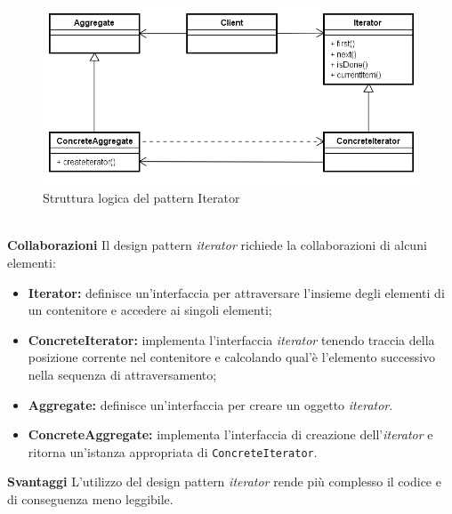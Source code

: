 \\
\label{Struttura logica del pattern Iterator}
\begin{figure}
	\centering
	\includegraphics[scale=0.45]{UML/Package/strutturaPattern/Iterator.png}
	\caption{Struttura logica del pattern Iterator}
\end{figure}
\\
\textbf{Collaborazioni}	Il design pattern \textit{iterator} richiede la collaborazioni di alcuni elementi:
	\begin{itemize}
		\item \textbf{Iterator:} definisce un'interfaccia per attraversare l'insieme degli elementi di un contenitore e accedere ai singoli elementi;
		\item \textbf{ConcreteIterator:} implementa l'interfaccia \textit{iterator} tenendo traccia della posizione corrente nel contenitore e calcolando qual'è l'elemento successivo nella sequenza di attraversamento;
		\item \textbf{Aggregate:} definisce un'interfaccia per creare un oggetto \textit{iterator}.
		\item \textbf{ConcreteAggregate:} implementa l'interfaccia di creazione dell'\textit{iterator} e ritorna un'istanza appropriata di \texttt{ConcreteIterator}.
	\end{itemize}
\textbf{Svantaggi}	L'utilizzo del design pattern \textit{iterator} rende più complesso il codice e di conseguenza meno leggibile.


